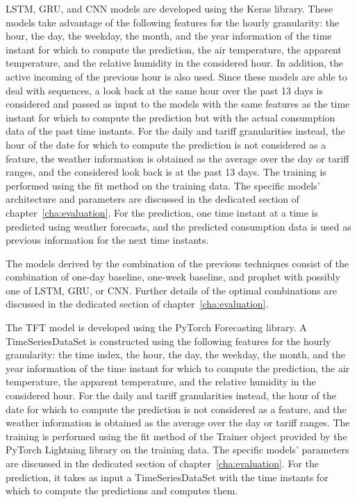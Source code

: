 LSTM, GRU, and CNN models are developed using the Keras library.
These models take advantage of the following features for the hourly granularity: the hour, the day, the weekday, the month, and the year information of the time instant for which to compute the prediction, the air temperature, the apparent temperature, and the relative humidity in the considered hour.
In addition, the active incoming of the previous hour is also used.
Since these models are able to deal with sequences, a look back at the same hour over the past 13 days is considered and passed as input to the models with the same features as the time instant for which to compute the prediction but with the actual consumption data of the past time instants.
For the daily and tariff granularities instead, the hour of the date for which to compute the prediction is not considered as a feature, the weather information is obtained as the average over the day or tariff ranges, and the considered look back is at the past 13 days.
The training is performed using the fit method on the training data.
The specific models’ architecture and parameters are discussed in the dedicated section of chapter~\ref{cha:evaluation}.
For the prediction, one time instant at a time is predicted using weather forecasts, and the predicted consumption data is used as previous information for the next time instants.

The models derived by the combination of the previous techniques consist of the combination of one-day baseline, one-week baseline, and prophet with possibly one of LSTM, GRU, or CNN.
Further details of the optimal combinations are discussed in the dedicated section of chapter~\ref{cha:evaluation}.

The TFT model is developed using the PyTorch Forecasting library.
A TimeSeriesDataSet is constructed using the following features for the hourly granularity: the time index, the hour, the day, the weekday, the month, and the year information of the time instant for which to compute the prediction, the air temperature, the apparent temperature, and the relative humidity in the considered hour.
For the daily and tariff granularities instead, the hour of the date for which to compute the prediction is not considered as a feature, and the weather information is obtained as the average over the day or tariff ranges.
The training is performed using the fit method of the Trainer object provided by the PyTorch Lightning library on the training data.
The specific models’ parameters are discussed in the dedicated section of chapter~\ref{cha:evaluation}.
For the prediction, it takes as input a TimeSeriesDataSet with the time instants for which to compute the predictions and computes them.

